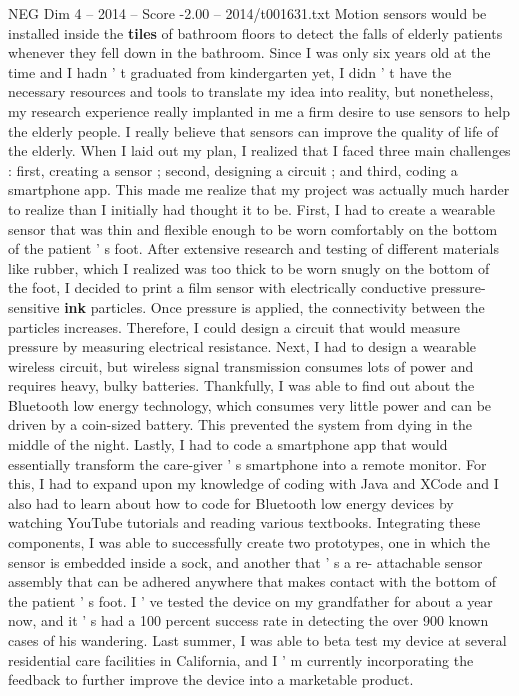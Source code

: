\begin{textsample}{NEG Dim 4 – 2014 – Score -2.00 – 2014/t001631.txt}
Motion sensors would be installed inside the \textbf{tiles} of bathroom floors to detect the falls of elderly patients whenever they fell down in the bathroom.
Since I was only six years old at the time and I hadn ' t graduated from kindergarten yet, I didn ' t have the necessary resources and tools to translate my idea into reality, but nonetheless, my research experience really implanted in me a firm desire to use sensors to help the elderly people.
I really believe that sensors can improve the quality of life of the elderly.
When I laid out my plan, I realized that I faced three main challenges : first, creating a sensor ; second, designing a circuit ; and third, coding a smartphone app.
This made me realize that my project was actually much harder to realize than I initially had thought it to be.
First, I had to create a wearable sensor that was thin and flexible enough to be worn comfortably on the bottom of the patient ' s foot.
After extensive research and testing of different materials like rubber, which I realized was too thick to be worn snugly on the bottom of the foot, I decided to print a film sensor with electrically conductive pressure-sensitive \textbf{ink} particles.
Once pressure is applied, the connectivity between the particles increases.
Therefore, I could design a circuit that would measure pressure by measuring electrical resistance.
Next, I had to design a wearable wireless circuit, but wireless signal transmission consumes lots of power and requires heavy, bulky batteries.
Thankfully, I was able to find out about the Bluetooth low energy technology, which consumes very little power and can be driven by a coin-sized battery.
This prevented the system from dying in the middle of the night.
Lastly, I had to code a smartphone app that would essentially transform the care-giver ' s smartphone into a remote monitor.
For this, I had to expand upon my knowledge of coding with Java and XCode and I also had to learn about how to code for Bluetooth low energy devices by watching YouTube tutorials and reading various textbooks.
Integrating these components, I was able to successfully create two prototypes, one in which the sensor is embedded inside a sock, and another that ' s a re- attachable sensor assembly that can be adhered anywhere that makes contact with the bottom of the patient ' s foot.
I ' ve tested the device on my grandfather for about a year now, and it ' s had a 100 percent success rate in detecting the over 900 known cases of his wandering.
Last summer, I was able to beta test my device at several residential care facilities in California, and I ' m currently incorporating the feedback to further improve the device into a marketable product.

\end{textsample}
